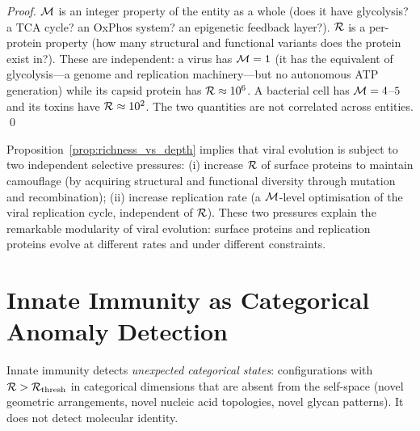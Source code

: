 \begin{proof}
$\mathcal{M}$ is an integer property of the entity as a whole (does it have
glycolysis? a TCA cycle? an OxPhos system? an epigenetic feedback layer?).
$\mathcal{R}$ is a per-protein property (how many structural and functional variants
does the protein exist in?). These are independent: a virus has $\mathcal{M} = 1$
(it has the equivalent of glycolysis---a genome and replication machinery---but
no autonomous ATP generation) while its capsid protein has $\mathcal{R} \approx 10^6$.
A bacterial cell has $\mathcal{M} = 4$--$5$ and its toxins have $\mathcal{R} \approx 10^2$.
The two quantities are not correlated across entities. \qed
\end{proof}

\begin{remark}
Proposition~\ref{prop:richness_vs_depth} implies that viral evolution is
subject to two independent selective pressures: (i) increase $\mathcal{R}$ of
surface proteins to maintain camouflage (by acquiring structural and functional
diversity through mutation and recombination); (ii) increase replication rate
(a $\mathcal{M}$-level optimisation of the viral replication cycle, independent of
$\mathcal{R}$). These two pressures explain the remarkable modularity of viral
evolution: surface proteins and replication proteins evolve at different rates
and under different constraints.
\end{remark}

\section{Innate Immunity as Categorical Anomaly Detection}
\label{sec:innate_anomaly}

\begin{theorem}
\label{thm:innate_anomaly}
Innate immunity detects \emph{unexpected categorical states}: configurations
with $\mathcal{R} > \mathcal{R}_{\mathrm{thresh}}$ in categorical dimensions that are
absent from the self-space (novel geometric arrangements, novel nucleic acid
topologies, novel glycan patterns). It does not detect molecular identity.
\end{theorem}

